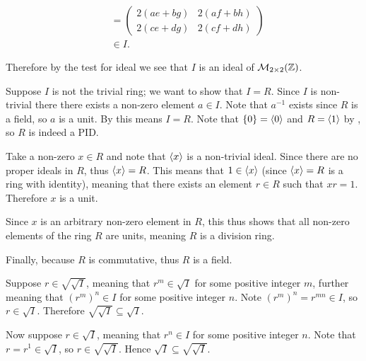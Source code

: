 \begin{questions}
\begin{itemize}
\begin{align*}
            &= \begin{pmatrix}2(ae+bg)&2(af+bh)\\2(ce+dg)&2(cf+dh)\end{pmatrix}\\
            &\in I.
        \end{align*}
    \end{itemize}
    Therefore by the test for ideal we see that $I$ is an ideal of $\mathcal{M}_{2\times2}(\mathbb{Z})$.

    \item \begin{partquestions}{\alph*}
        \item Suppose $I$ is not the trivial ring; we want to show that $I = R$. Since $I$ is non-trivial there there exists a non-zero element $a \in I$. Note that $a^{-1}$ exists since $R$ is a field, so $a$ is a unit. By  this means $I = R$. Note that $\{0\} = \left\langle0\right\rangle$ and $R = \left\langle1\right\rangle$ by , so $R$ is indeed a PID.

        \item Take a non-zero $x \in R$ and note that $\left\langle x\right\rangle$ is a non-trivial ideal. Since there are no proper ideals in $R$, thus $\left\langle x\right\rangle = R$. This means that $1 \in \left\langle x\right\rangle$ (since $\left\langle x\right\rangle = R$ is a ring with identity), meaning that there exists an element $r \in R$ such that $xr = 1$. Therefore $x$ is a unit.

        Since $x$ is an arbitrary non-zero element in $R$, this thus shows that all non-zero elements of the ring $R$ are units, meaning $R$ is a division ring.

        Finally, because $R$ is commutative, thus $R$ is a field.
    \end{partquestions}

    \item \begin{partquestions}{\alph*}
        \item Suppose $r \in \sqrt{\sqrt{I}}$, meaning that $r^m \in \sqrt{I}$ for some positive integer $m$, further meaning that $(r^m)^n \in I$ for some positive integer $n$. Note $(r^m)^n = r^{mn} \in I$, so $r \in \sqrt{I}$. Therefore $\sqrt{\sqrt{I}} \subseteq \sqrt{I}$.

        Now suppose $r \in \sqrt{I}$, meaning that $r^n \in I$ for some positive integer $n$. Note that $r = r^1 \in \sqrt{I}$, so $r \in \sqrt{\sqrt{I}}$. Hence $\sqrt{I} \subseteq \sqrt{\sqrt{I}}$.


\end{partquestions}
\end{questions}

